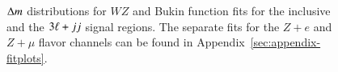 \begin{figure}[htbp]
    \centering
	\caption{$\Delta m$ distributions for $WZ$ and Bukin function fits for the inclusive and the $3\ell+jj$ signal regions. The separate fits for the $Z+e$ and $Z+\mu$ flavor channels can be found in Appendix~\ref{sec:appendix-fitplots}.}
	\label{fig:WZ-DiBosonFit}
\end{figure}
 
